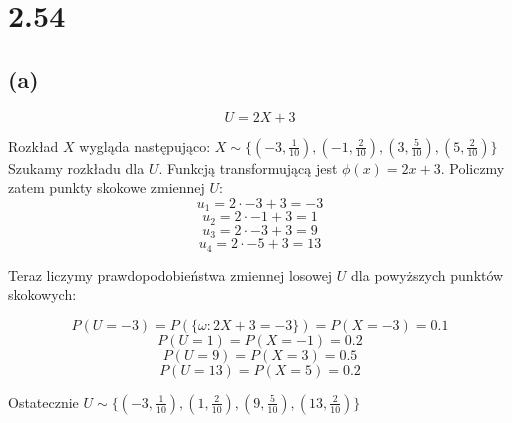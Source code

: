 \documentclass{article}
\begin{document}
\section*{2.54}

\subsection*{(a)}

\begin{equation*}
    U = 2X + 3
\end{equation*}



Rozkład \(X\) wygląda następująco: \(X \sim \{(-3, \frac{1}{10}), (-1, \frac{2}{10}), (3, \frac{5}{10}), (5, \frac{2}{10})\}\)
Szukamy rozkładu dla \(U\). Funkcją transformującą jest \(\phi(x) = 2x + 3\). Policzmy zatem punkty skokowe zmiennej \(U\):
\begin{equation*}
    u_1 = 2 \cdot -3 + 3 = -3
\end{equation*}
\begin{equation*}
    u_2 = 2 \cdot -1 + 3 = 1
\end{equation*}
\begin{equation*}
    u_3 = 2 \cdot -3 + 3 = 9
\end{equation*}
\begin{equation*}
    u_4 = 2 \cdot -5 + 3 = 13
\end{equation*}

Teraz liczymy prawdopodobieństwa zmiennej losowej \(U\) dla powyższych punktów skokowych:

\begin{equation*}
    P(U = -3) = P(\{\omega: 2X + 3 = -3\}) = P(X = -3) = 0.1
\end{equation*}
\begin{equation*}
    P(U = 1) = P(X = -1) = 0.2
\end{equation*}
\begin{equation*}
    P(U = 9) = P(X = 3) = 0.5
\end{equation*}
\begin{equation*}
    P(U = 13) = P(X = 5) = 0.2
\end{equation*}

Ostatecznie \(U \sim \{(-3, \frac{1}{10}), (1, \frac{2}{10}), (9, \frac{5}{10}), (13, \frac{2}{10})\}\)
\end{document}
